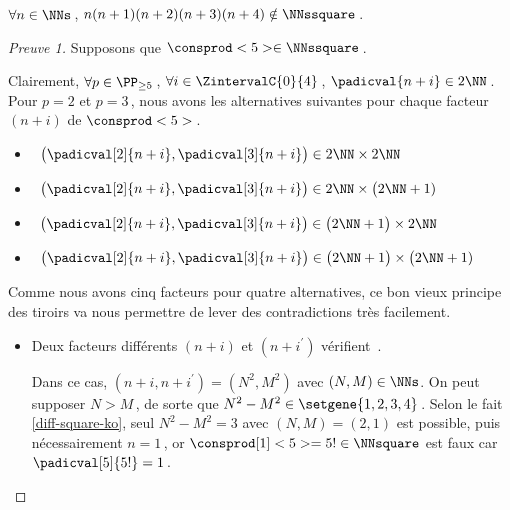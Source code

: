 \begin{fact} \label{case-5}
	 $\forall n \in \NNs$\,, $n(n+1)(n+2)(n+3)(n+4) \notin \NNssquare$\,.
\end{fact}




\begin{proof}[Preuve 1]%
    Supposons que $\consprod<5> \in \NNssquare$\,.
    
    \smallskip
    
    Clairement, 
    $\forall p \in \PP_{\geq 5}$\,, 
    $\forall i \in \ZintervalC{0}{4}$\,, 
    $\padicval{n + i} \in 2 \NN$\,.
    Pour $p = 2$ et $p = 3$\,, nous avons les alternatives suivantes pour chaque facteur $(n+i)$ de $\consprod<5>$\,.
    \begin{itemize}
    	\smallskip
		\item {}\,
		$\big( \padicval[2]{n + i} , \padicval[3]{n + i} \big) \in 2 \NN \times 2 \NN$

    	\smallskip
		\item {}\,
		$\big( \padicval[2]{n + i} , \padicval[3]{n + i} \big) \in 2 \NN \times \big( 2 \NN + 1)$

    	\smallskip
		\item {}\,
		$\big( \padicval[2]{n + i} , \padicval[3]{n + i} \big) \in \big( 2 \NN + 1 \big) \times 2 \NN$

    	\smallskip
		\item {}\,
		$\big( \padicval[2]{n + i} , \padicval[3]{n + i} \big) \in \big( 2 \NN + 1 \big) \times \big( 2 \NN + 1)$
    \end{itemize}
    
    \medskip
    
    Comme nous avons cinq facteurs pour quatre alternatives, ce bon vieux principe des tiroirs va nous permettre de lever des contradictions très facilement.
    \begin{itemize}
    	\medskip
		\item Deux facteurs différents $(n+i)$ et $(n+i^\prime)$ vérifient \,.
		
		\smallskip
		\noindent
		Dans ce cas, $(n+i, n+i^\prime) = (N^2, M^2)$ avec $(N, M) \in \NNs$.
		On peut supposer $N > M$\,, de sorte que $N^2 - M^2 \in \setgene{1, 2, 3, 4}$\,. 
		Selon le fait \ref{diff-square-ko}, seul $N^2 - M^2 = 3$ avec $(N, M) = (2, 1)$ est possible, puis nécessairement $n = 1$\,, or $\consprod[1]<5> = 5 ! \in \NNsquare$ est faux car $\padicval[5]{5!} = 1$\,.
		

\end{itemize}
\end{proof}
